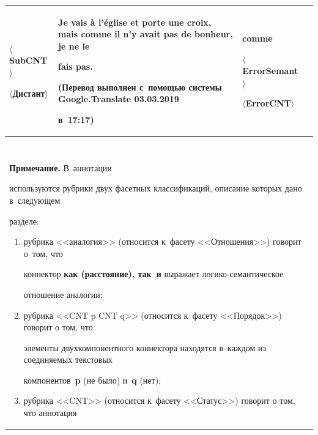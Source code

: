 \begin{table}
\begin{center}
\begin{tabular}{|p{30mm}|p{30mm}|p{30mm}|p{22mm}|}
$\langle$SubCNT$\rangle$\newline


$\langle$Дистант$\rangle$


&Je vais \`{a} l'\'{e}glise et porte une croix, mais \textbf{comme} il n'y avait pas de bonheur, je ne le 


fais pas.\newline


(Перевод выполнен с~помощью системы Google.Translate 03.03.2019 


в~17:17)&\textbf{comme}\newline


$\langle$ErrorSemant$\rangle$\newline


$\langle$ErrorCNT$\rangle$\\


\hline


\multicolumn{4}{c}{\ }\\[-9pt]


  \multicolumn{4}{p{124mm}}{\footnotesize \hspace*{2mm}\textbf{Примечание.} В~аннотации 


используются рубрики двух фасетных классификаций, описание которых дано в~следующем 


разделе:


\vspace*{-3pt}


  \begin{enumerate}[(1)]


\item рубрика <<аналогия>> (относится к~фасету <<Отношения>>) говорит о~том, что 


коннектор \textbf{как (расстояние), так~и} выражает ло\-ги\-ко-се\-ман\-ти\-че\-ское 


отношение аналогии;


\vspace*{-3pt}


\item рубрика <<CNT p CNT q>> (относится к~фасету <<Порядок>>) говорит о том, что 


элементы двухкомпонентного коннектора находятся в~каждом из соединяемых текстовых 


компонентов~\textbf{p} (не было) и~\textbf{q} (нет);


\vspace*{-3pt}


\item рубрика <<CNT>> (относится к~фасету <<Статус>>) говорит о том, что аннотация 



\end{enumerate}}
\end{tabular}
\end{center}
\end{table}

